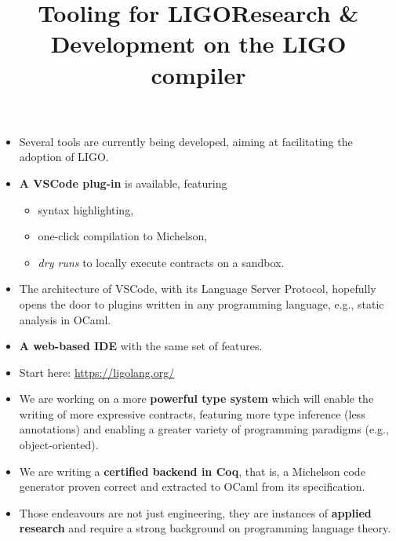 \documentclass[wide]{slides}
\begin{document}
\begin{slide}
  \title{Tooling for LIGO}

  \begin{itemize}

    \item Several tools are currently being developed, aiming at
      facilitating the adoption of LIGO.

    \item \textbf{A VSCode plug-in} is available,
      featuring
      \begin{itemize}

        \item syntax highlighting,

        \item one-click compilation to Michelson,

        \item \emph{dry runs} to locally execute contracts on a
          sandbox.


      \end{itemize}

    \item The architecture of VSCode, with its Language Server
      Protocol, hopefully opens the door to plugins written in any
      programming language, e.g., static analysis in OCaml.

    \item \textbf{A web-based IDE} with the same set of features.

    \item Start here: \url{https://ligolang.org/}

  \end{itemize}

\end{slide}

\begin{slide}
  \title{Research \& Development on the LIGO compiler}

  \begin{itemize}

    \item We are working on a more \textbf{powerful type system} which
      will enable the writing of more expressive contracts, featuring
      more type inference (less annotations) and enabling a greater
      variety of programming paradigms (e.g., object-oriented).

    \item We are writing a \textbf{certified backend in Coq}, that is,
      a Michelson code generator proven correct and extracted to OCaml
      from its specification.

    \item Those endeavours are not just engineering, they are
      instances of \textbf{applied research} and require a strong
      background on programming language theory.

  \end{itemize}

\end{slide}
\end{document}
